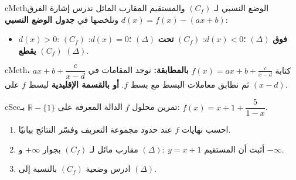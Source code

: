 \documentclass[12pt,a4paper]{article}
\newenvironment{BOX}[2]{\begin{otherlanguage}{english}\begin{arbox}{#1}{#2}}{\end{arbox}\end{otherlanguage}}
\newenvironment{tariqa}[1][طريقة]{\begin{BOX}{cMeth}{#1}}{\end{BOX}}
\newcounter{exo}
\newcommand{\R}{\mathbb{R}}
\newenvironment{tmr}{\stepcounter{exo}\begin{BOX}{cSec}{تمرين محلول \theexo}}{\end{BOX}}
\begin{document}
\begin{tariqa}[الوضع النسبي لـ $(C_f)$ والمستقيم المقارب المائل]
ندرس إشارة الفرق $d(x)=f(x)-(ax+b)$ ونلخصها في \textbf{جدول الوضع النسبي}:
\begin{itemize}
\item $d(x)>0$: $(C_f)$ \textbf{فوق} $(\Delta)$ \quad؛\quad $d(x)<0$: $(C_f)$ \textbf{تحت} $(\Delta)$ \quad؛\quad $d(x)=0$: $(C_f)$ \textbf{يقطع} $(\Delta)$.
\end{itemize}
\end{tariqa}

\begin{tariqa}[كتابة $f(x)=ax+b+\frac{c}{x-d}$]
\textbf{بالمطابقة:} نوحد المقامات في $ax+b+\dfrac{c}{x-d}$ ، ثم نطابق معاملات البسط مع بسط $f$. \textbf{أو بالقسمة الإقليدية} لبسط $f$ على $(x-d)$.
\end{tariqa}

\begin{tmr}
$f$ الدالة المعرفة على $\R-\{1\}$ بـ: $f(x)=x+1+\dfrac5{1-x}$.
\begin{enumerate}
\item احسب نهايات $f$ عند حدود مجموعة التعريف وفسّر النتائج بيانيًا.
\item أثبت أن المستقيم $(\Delta):\ y=x+1$ مقارب مائل لـ $(C_f)$ بجوار $+\infty$ و $-\infty$.
\item ادرس وضعية $(C_f)$ بالنسبة إلى $(\Delta)$.
\end{enumerate}
\end{tmr}
\end{document}
